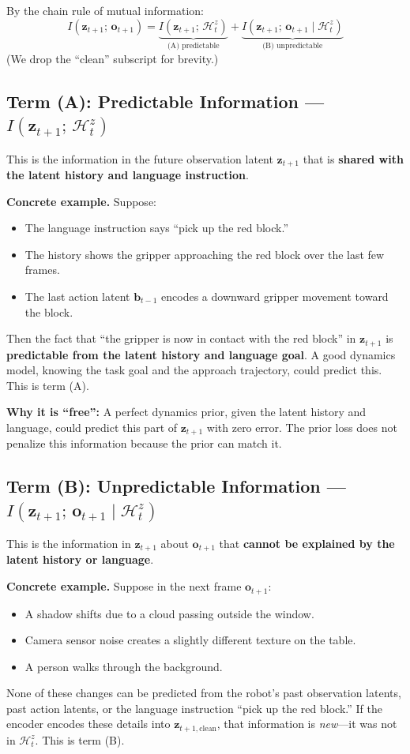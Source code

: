 \documentclass{article}
\newcommand{\vo}{\bm{o}}
\newcommand{\vz}{\bm{z}}
\newcommand{\vb}{\bm{b}}
\begin{document}
By the chain rule of mutual information:
\begin{equation}
  \boxed{I(\vz_{t+1};\, \vo_{t+1}) = \underbrace{I(\vz_{t+1};\, \mathcal{H}_t^z)}_{\text{(A) predictable}} + \underbrace{I(\vz_{t+1};\, \vo_{t+1} \mid \mathcal{H}_t^z)}_{\text{(B) unpredictable}}}
  \label{eq:decomp}
\end{equation}
(We drop the ``clean'' subscript for brevity.)

\subsection{Term (A): Predictable Information --- $I(\vz_{t+1};\, \mathcal{H}_t^z)$}

This is the information in the future observation latent $\vz_{t+1}$ that is \textbf{shared with the latent history and language instruction}.

\textbf{Concrete example.} Suppose:
\begin{itemize}[leftmargin=*]
  \item The language instruction says ``pick up the red block.''
  \item The history shows the gripper approaching the red block over the last few frames.
  \item The last action latent $\vb_{t-1}$ encodes a downward gripper movement toward the block.
\end{itemize}
Then the fact that ``the gripper is now in contact with the red block'' in $\vz_{t+1}$ is \textbf{predictable from the latent history and language goal}. A good dynamics model, knowing the task goal and the approach trajectory, could predict this. This is term (A).

\textbf{Why it is ``free'':} A perfect dynamics prior, given the latent history and language, could predict this part of $\vz_{t+1}$ with zero error. The prior loss does not penalize this information because the prior can match it.

\subsection{Term (B): Unpredictable Information --- $I(\vz_{t+1};\, \vo_{t+1} \mid \mathcal{H}_t^z)$}

This is the information in $\vz_{t+1}$ about $\vo_{t+1}$ that \textbf{cannot be explained by the latent history or language}.

\textbf{Concrete example.} Suppose in the next frame $\vo_{t+1}$:
\begin{itemize}[leftmargin=*]
  \item A shadow shifts due to a cloud passing outside the window.
  \item Camera sensor noise creates a slightly different texture on the table.
  \item A person walks through the background.
\end{itemize}
None of these changes can be predicted from the robot's past observation latents, past action latents, or the language instruction ``pick up the red block.'' If the encoder encodes these details into $\vz_{t+1,\text{clean}}$, that information is \emph{new}---it was not in $\mathcal{H}_t^z$. This is term (B).
\end{document}
